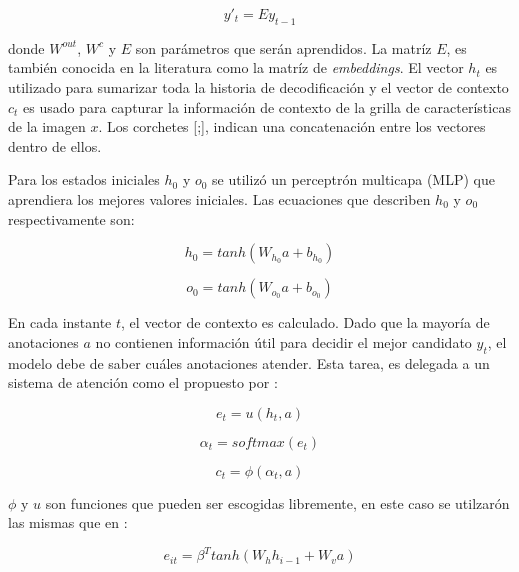 \begin{equation}
    y'_{t} = E y_{t-1}
\end{equation}

donde $W ^ {out}$, $W ^ {c}$ y $E$ son parámetros que serán aprendidos. La matríz $E$, es también conocida en la literatura como la matríz de \textit{embeddings}. El vector $h_{t}$ es utilizado para sumarizar toda la historia de decodificación y el vector de contexto $c_{t}$ es usado para capturar la información de contexto de la grilla de características de la imagen $x$. Los corchetes [;], indican una concatenación entre los vectores dentro de ellos.

Para los estados iniciales $h_{0}$ y $o_{0}$ se utilizó un perceptrón multicapa (MLP) que aprendiera los mejores valores iniciales. Las ecuaciones que describen $h_{0}$ y $o_{0}$ respectivamente son:

\begin{equation}
    h_{0} = tanh(W_{h_{0}}a + b_{h_{0}})
\end{equation}

\begin{equation}
    o_{0} = tanh(W_{o_{0}}a + b_{o_{0}})
\end{equation}

En cada instante $t$, el vector de contexto es calculado. Dado que la mayoría de anotaciones $a$ no contienen información útil para decidir el mejor candidato $y_{t}$, el modelo debe de saber cuáles anotaciones atender. Esta tarea, es delegada a un sistema de atención como el propuesto por \cite{bahdanau2014neural}:

\begin{equation}
    e_{t} = u(h_{t}, a)
\end{equation}

\begin{equation}
    \alpha_{t} = softmax(e_{t})
\end{equation}

\begin{equation}
    c_{t} = \phi(\alpha_{t}, a)
\end{equation}

$\phi$ y $u$ son funciones que pueden ser escogidas libremente, en este caso se utilzarón las mismas que en \cite{harvard}:

\begin{equation}
    e_{it} = \beta ^ {T} tanh(W_{h}h_{i-1} + W_{v}a)
    \label{eq:e-attention}
\end{equation}

